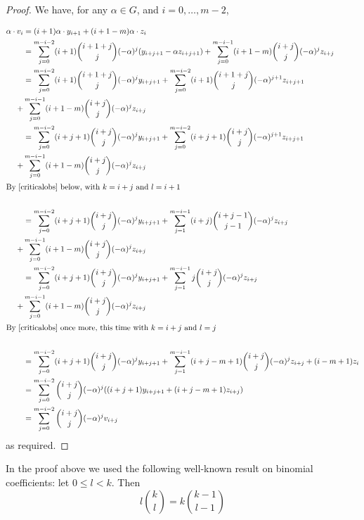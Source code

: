 \documentclass[a4paper]{amsart}
\theoremstyle{definition}
\theoremstyle{remark}
\theoremstyle{Acknowledgments}
\begin{document}
\begin{proof}
We have, for any $\alpha \in G$, and $i=0, \ldots, m-2$,

\begin{align*} \alpha \cdot v_i &=  (i+1)\alpha \cdot y_{i+1} + (i+1-m) \alpha \cdot z_i\\
&=  \sum_{j=0}^{m-i-2} (i+1)\binom{i+1+j}{j}(-\alpha)^j (y_{i+j+1} - \alpha z_{i+j+1})  + \sum_{j=0}^{m-i-1}(i+1-m)\binom{i+j}{j} (-\alpha)^j  z_{i+j}\\
&=  \sum_{j=0}^{m-i-2} (i+1)\binom{i+1+j}{j}(-\alpha)^j y_{i+j+1} + \sum_{j=0}^{m-i-2} (i+1)\binom{i+1+j}{j}(-\alpha)^{j+1} z_{i+j+1} \\ +& \sum_{j=0}^{m-i-1}(i+1-m)\binom{i+j}{j} (-\alpha)^j  z_{i+j}\\
&=   \sum_{j=0}^{m-i-2} (i+j+1)\binom{i+j}{j}(-\alpha)^j y_{i+j+1} + \sum_{j=0}^{m-i-2}  (i+j+1)\binom{i+j}{j} (-\alpha)^{j+1} z_{i+j+1} \\ +& \sum_{j=0}^{m-i-1}(i+1-m)\binom{i+j}{j} (-\alpha)^j  z_{i+j}\\
\intertext{By \eqref{criticalobs} below, with $k=i+j$ and $l=i+1$}\\
&=   \sum_{j=0}^{m-i-2} (i+j+1)\binom{i+j}{j}(-\alpha)^j y_{i+j+1} + \sum_{j=1}^{m-i-1}  (i+j)\binom{i+j-1}{j-1} (-\alpha)^{j} z_{i+j} \\ +& \sum_{j=0}^{m-i-1}(i+1-m)\binom{i+j}{j} (-\alpha)^j  z_{i+j}\\
&=   \sum_{j=0}^{m-i-2} (i+j+1)\binom{i+j}{j}(-\alpha)^j y_{i+j+1} + \sum_{j=1}^{m-i-1}  j\binom{i+j}{j} (-\alpha)^{j} z_{i+j} \\ +& \sum_{j=0}^{m-i-1}(i+1-m)\binom{i+j}{j} (-\alpha)^j  z_{i+j}\\
\intertext{By \eqref{criticalobs} once more, this time with $k=i+j$ and $l=j$}\\
&=   \sum_{j=0}^{m-i-2} (i+j+1)\binom{i+j}{j}(-\alpha)^j y_{i+j+1} + \sum_{j=1}^{m-i-1}  (i+j-m+1) \binom{i+j}{j}(-\alpha)^j z_{i+j}+(i-m+1)z_{i}\\
&=   \sum_{j=0}^{m-i-2} \binom{i+j}{j}(-\alpha)^j ((i+j+1)y_{i+j+1} + (i+j-m+1)z_{i+j})\\
&=   \sum_{j=0}^{m-i-2} \binom{i+j}{j}(-\alpha)^j  v_{i+j}
\end{align*}
as required.
\end{proof}

In the proof above we used the following well-known result on binomial coefficients:  let $0 \leq l<k$. Then
\begin{equation}\label{criticalobs}l\binom{k}{l} = k \binom{k-1}{l-1}\end{equation}
\end{document}
